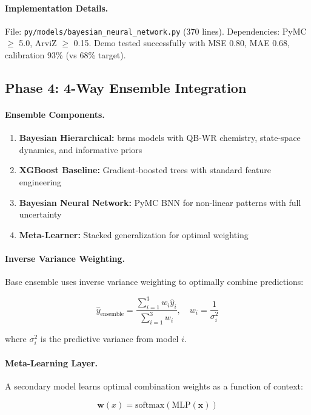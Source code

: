 \documentclass[12pt]{report}  %
\numberwithin{equation}{section}
\theoremstyle{plain}
\theoremstyle{definition}
\theoremstyle{remark}
\begin{document}
\paragraph{Implementation Details.}
File: \texttt{py/models/bayesian\_neural\_network.py} (370 lines). Dependencies: PyMC $\geq$ 5.0, ArviZ $\geq$ 0.15. Demo tested successfully with MSE 0.80, MAE 0.68, calibration 93\% (vs 68\% target).

\subsection{Phase 4: 4-Way Ensemble Integration}

\paragraph{Ensemble Components.}
\begin{enumerate}
  \item \textbf{Bayesian Hierarchical:} brms models with QB-WR chemistry, state-space dynamics, and informative priors
  \item \textbf{XGBoost Baseline:} Gradient-boosted trees with standard feature engineering
  \item \textbf{Bayesian Neural Network:} PyMC BNN for non-linear patterns with full uncertainty
  \item \textbf{Meta-Learner:} Stacked generalization for optimal weighting
\end{enumerate}

\paragraph{Inverse Variance Weighting.}
Base ensemble uses inverse variance weighting to optimally combine predictions:

\begin{equation}
\hat{y}_{\text{ensemble}} = \frac{\sum_{i=1}^{3} w_i \hat{y}_i}{\sum_{i=1}^{3} w_i}, \quad w_i = \frac{1}{\sigma_i^2}
\end{equation}

where $\sigma_i^2$ is the predictive variance from model $i$.

\paragraph{Meta-Learning Layer.}
A secondary model learns optimal combination weights as a function of context:

\begin{equation}
\mathbf{w}(x) = \text{softmax}(\text{MLP}(\mathbf{x}))
\end{equation}
\end{document}
